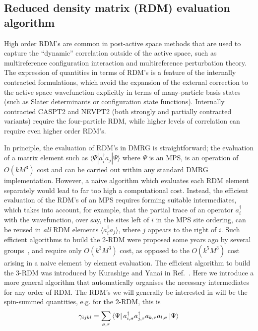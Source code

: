 \subsection{Reduced density matrix (RDM) evaluation algorithm}

High order RDM's are common in post-active space methods that are used
to capture the ``dynamic'' correlation outside of the active space, such as multireference configuration interaction\cite{buenker_individualized_1974} and multireference perturbation theory\cite{andersson_second-order_1990, angeli_n-electron_2002}. 
The expression of quantities in terms of RDM's is a feature of the internally contracted formulations,
which avoid the expansion of the external correction to the active space wavefunction explicitly in terms of many-particle basis states (such as Slater determinants
or configuration state functions). Internally contracted CASPT2\cite{andersson_second-order_1990} and NEVPT2\cite{angeli_n-electron_2002} (both strongly 
and partially contracted variants) require the four-particle RDM, while
 higher levels of correlation can require even higher order RDM's.

In principle, the evaluation of RDM's in DMRG is straightforward; the evaluation of a matrix element such as $\langle \Psi|a^\dag_i a_j |\Psi\rangle$ where $\Psi$
is an MPS, is an operation of $O(k M^3)$ cost and can be carried out 
within any standard DMRG implementation. However, a naive algorithm which 
evaluates each RDM element separately would lead to far too high a computational cost. Instead, the efficient evaluation of the RDM's of an MPS requires forming
suitable intermediates, which takes into account, for example, that the partial trace of an operator $a^\dag_i$ with the wavefunction, over say, the sites left of $i$ in the MPS site ordering, can be reused in {\it all} RDM elements $\langle a^\dag_i a_j \rangle$, where $j$ appears to the right of $i$. Such efficient
algorithms to build the 2-RDM were proposed some years ago by several groups~\cite{ghosh_orbital_2008,zgid_obtaining_2008}, and require only $O(k^3 M^3)$ cost, as opposed to the $O(k^5 M^3)$
cost arising in a naive element by element evaluation. The efficient algorithm to build the 3-RDM was introduced by Kurashige and Yanai in Ref.~\cite{kurashige_second-order_2011}.
Here we introduce a more general algorithm that automatically organises the necessary intermediates for any order of RDM. 
The RDM's we will generally be interested in will be the
spin-summed quantities, e.g. for the 2-RDM, this is
\begin{equation}
\gamma_{ijkl}=\sum_{\sigma,\tau} \bra{\Psi}a^\dagger_{i,\sigma}a^\dagger_{j,\tau}a_{k,\tau}a_{l,\sigma}\ket{\Psi}
\end{equation}


